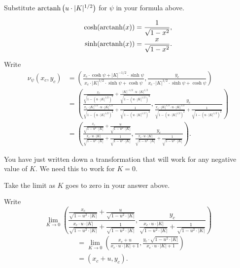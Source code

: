 \documentclass[12pt,noauthor,nooutcomes,handout,hints,newpage]{ximera}
\begin{document}
\begin{problem}
  Substitute $\operatorname{arctanh}\left(u\cdot|K|^{1/2}\right)$ for $\psi$ in your formula above.
  \begin{hint}
    \begin{align*}
    \cosh(\operatorname{arctanh}(x)) &= \frac{1}{\sqrt{1-x^2}},\\
    \sinh(\operatorname{arctanh}(x)) &= \frac{x}{\sqrt{1-x^2}}.
    \end{align*}
  \end{hint}
  \begin{freeResponse}
    Write
    \begin{align*}
      \nu_\psi(x_c,y_c) &= \left(\frac{x_c\cdot\cosh\psi+|K|^{-1/2}\cdot\sinh\psi}{x_c\cdot|K|^{1/2}\cdot\sinh\psi+\cosh\psi},\frac{y_c}{x_c\cdot|K|^{1/2}\cdot\sinh\psi+\cosh\psi}\right)\\
      &= \left(\frac{\frac{x_c}{\sqrt{1-\left(u\cdot|K|^{1/2}\right)^2}} + \frac{|K|^{-1/2}\cdot u\cdot|K|^{1/2}}{\sqrt{1-\left(u\cdot|K|^{1/2}\right)^2}}}
         {\frac{x_c\cdot |K|^{1/2}\cdot u \cdot |K|^{1/2}}{\sqrt{1-\left(u\cdot|K|^{1/2}\right)^2}}+\frac{1}{\sqrt{1-\left(u\cdot |K|^{1/2}\right)^2}}},
         \frac{y_c}{\frac{x_c\cdot |K|^{1/2}\cdot u \cdot |K|^{1/2}}{\sqrt{1-\left(u\cdot|K|^{1/2}\right)^2}}+\frac{1}{\sqrt{1-\left(u\cdot |K|^{1/2}\right)^2}}}\right)\\
         &= \left(\frac{\frac{x_c}{\sqrt{1-u^2\cdot|K|}} + \frac{u}{\sqrt{1-u^2\cdot|K|}}}
         {\frac{x_c\cdot u \cdot |K|}{\sqrt{1-u^2\cdot|K|}}+\frac{1}{\sqrt{1-u^2\cdot |K|}}},
         \frac{y_c}{\frac{x_c\cdot u \cdot |K|}{\sqrt{1-u^2\cdot|K|}}+\frac{1}{\sqrt{1-u^2\cdot |K|}}}\right).
    \end{align*}
  \end{freeResponse}
\end{problem}

You have just written down a transformation that will work for any
negative value of $K$. We need this to work for $K=0$.

\begin{problem}
  Take the limit as $K$ goes to zero in your answer above.
  \begin{freeResponse}
    Write
    \[
    \lim_{K\to 0} \left(\frac{\frac{x_c}{\sqrt{1-u^2\cdot|K|}} + \frac{u}{\sqrt{1-u^2\cdot|K|}}}
         {\frac{x_c\cdot u \cdot |K|}{\sqrt{1-u^2\cdot|K|}}+\frac{1}{\sqrt{1-u^2\cdot |K|}}},
         \frac{y_c}{\frac{x_c\cdot u \cdot |K|}{\sqrt{1-u^2\cdot|K|}}+\frac{1}{\sqrt{1-u^2\cdot |K|}}}\right)
         \]
         \begin{align*}
           &= \lim_{K\to 0}\left(\frac{x_c + u}{x_c\cdot u \cdot |K|+1},\frac{y_c\cdot \sqrt{1-u^2\cdot|K|}}{x_c\cdot u \cdot |K|+1}\right)\\
           &=(x_c+u,y_c).
         \end{align*}
  \end{freeResponse}
\end{problem}
\end{document}
